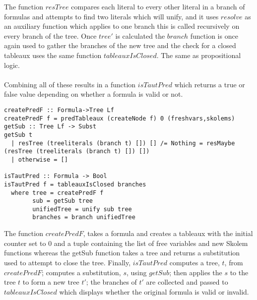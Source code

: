 \documentclass{article}%
\begin{document}
The function $resTree$ compares each literal to every other literal in a branch of formulas and attempts to find two literals which will unify, and it uses $resolve$ as an auxiliary function which applies to one branch this is called recursively on every branch of the tree.
Once $tree'$ is calculated the $branch$ function is once again used to gather the branches of the new tree and the check for a closed tableaux uses the same function $tableauxIsClosed$. The same as propositional logic.\\\\
Combining all of these results in a function $isTautPred$ which returns a true or false value depending on whether a formula is valid or not.

\begin{verbatim}
createPredF :: Formula->Tree Lf
createPredF f = predTableaux (createNode f) 0 (freshvars,skolems)
getSub :: Tree Lf -> Subst
getSub t 
  | resTree (treeliterals (branch t) []) [] /= Nothing = resMaybe (resTree (treeliterals (branch t) []) [])
  | otherwise = []

isTautPred :: Formula -> Bool
isTautPred f = tableauxIsClosed branches
  where tree = createPredF f
        sub = getSub tree
        unifiedTree = unify sub tree
        branches = branch unifiedTree
\end{verbatim}
The function $createPredF$, takes a formula and creates a tableaux with the initial counter set to 0 and a tuple containing the list of free variables and new Skolem functions whereas the getSub function takes a tree and returns a substitution used to attempt to close the tree. Finally, $isTautPred$ computes a tree, $t$, from $createPredF$; computes a substitution, $s$, using $getSub$; then applies the $s$ to the tree $t$ to form a new tree $t'$; the branches of $t'$ are collected and passed to $tableauxIsClosed$ which displays whether the original formula is valid or invalid. 
\end{document}
